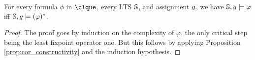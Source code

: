 \begin{theorem}\label{thm:guard_wmso}
For every formula $\phi$ in $\clque$, every LTS $\mathbb{S}$, and assignment $g$, we have $\mathbb{S}, g \models \varphi$ iff $\mathbb{S}, g \models (\varphi)^*$.
%
%
\end{theorem}
\begin{proof}
The proof goes by induction on the complexity of $\varphi$, the only critical step being the least fixpoint operator one. But this follows by applying Proposition \ref{prop:cor_constructivity} and the induction hypothesis.
%

\end{proof}
